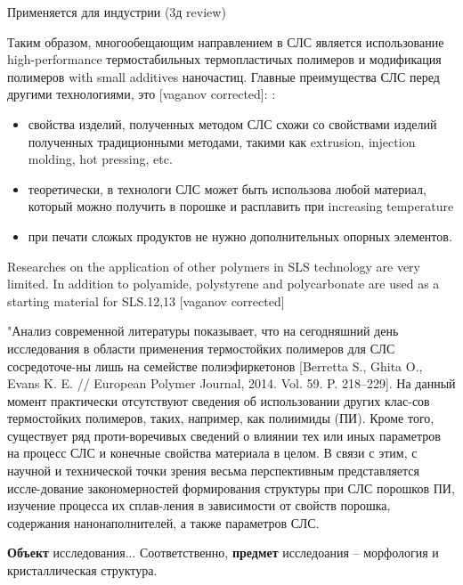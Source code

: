 Применяется для индустрии (3д review)

Таким образом, многообещающим направлением в СЛС является использование high-performance термостабильных термопластичых полимеров и модификация полимеров with small additives наночастиц.
Главные преимущества СЛС перед другими технологиями, это 	[vaganov corrected]:
:
\begin{itemize}
    \item свойства изделий, полученных методом СЛС схожи со свойствами изделий полученных традиционными методами, такими как extrusion, injection molding, hot pressing, etc.
    \item теоретически, в технологи СЛС может быть использова любой материал, который можно получить в порошке и расплавить при increasing temperature
    \item при печати сложых продуктов не нужно дополнительных опорных элементов.
\end{itemize}

	Researches on the application of other polymers in SLS technology are very limited. In addition to polyamide, polystyrene and polycarbonate are used as a starting material for SLS.12,13
	[vaganov corrected]
	
	"Анализ современной литературы показывает, что на сегодняшний день исследования в области применения термостойких полимеров для СЛС сосредоточе-ны лишь на семействе полиэфиркетонов [Berretta S., Ghita O., Evans K. E. // European Polymer Journal, 2014. Vol. 59. P. 218–229]. На данный момент практически отсутствуют сведения об использовании других клас-сов термостойких полимеров, таких, например, как полиимиды (ПИ). Кроме того, существует ряд проти-воречивых сведений о влиянии тех или иных параметров на процесс СЛС и конечные свойства материала в целом. В связи с этим, с научной и технической точки зрения весьма перспективным представляется иссле-дование закономерностей формирования структуры при СЛС порошков ПИ, изучение процесса их сплав-ления в зависимости от свойств порошка, содержания нанонаполнителей, а также параметров СЛС.
\cite{yudin-red}
	

\textbf{Объект} исследования... Соответственно, \textbf{предмет} исследоания -- морфология и кристаллическая структура.


